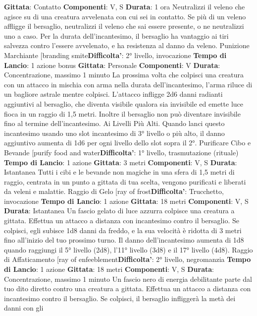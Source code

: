 \begin{multicols}{2}
\textbf{Gittata}: Contatto
\textbf{Componenti}: V, S
\textbf{Durata}: 1 ora
Neutralizzi il veleno che agisce su di una creatura
avvelenata con cui sei in contatto. Se più di un veleno
affligge il bersaglio, neutralizzi il veleno che sai essere
presente, o ne neutralizzi uno a caso.
Per la durata dell’incantesimo, il bersaglio ha vantaggio
ai tiri salvezza contro l’essere avvelenato, e ha
resistenza al danno da veleno.
Punizione Marchiante
[branding smite\textbf{Difficolta'}:
2° livello, invocazione
\textbf{Tempo di Lancio}: 1 azione bonus
\textbf{Gittata}: Personale
\textbf{Componenti}: V
\textbf{Durata}: Concentrazione, massimo 1 minuto
La prossima volta che colpisci una creatura con un
attacco in mischia con arma nella durata
dell’incantesimo, l’arma riluce di un bagliore astrale
mentre colpisci. L’attacco infligge 2d6 danni radianti
aggiuntivi al bersaglio, che diventa visibile qualora sia
invisibile ed emette luce fioca in un raggio di 1,5 metri.
Inoltre il bersaglio non può diventare invisibile fino al
termine dell’incantesimo.
Ai Livelli Più Alti. Quando lanci questo incantesimo
usando uno slot incantesimo di 3° livello o più alto, il
danno aggiuntivo aumenta di 1d6 per ogni livello dello
slot sopra il 2°.
Purificare Cibo e Bevande
[purify food and water\textbf{Difficolta'}:
1° livello, trasmutazione (rituale)
\textbf{Tempo di Lancio}: 1 azione
\textbf{Gittata}: 3 metri
\textbf{Componenti}: V, S
\textbf{Durata}: Istantanea
Tutti i cibi e le bevande non magiche in una sfera di 1,5
metri di raggio, centrata in un punto a gittata di tua
scelta, vengono purificati e liberati da veleni e malattie.
Raggio di Gelo
[ray of frost\textbf{Difficolta'}:
Trucchetto, invocazione
\textbf{Tempo di Lancio}: 1 azione
\textbf{Gittata}: 18 metri
\textbf{Componenti}: V, S
\textbf{Durata}: Istantanea
Un fascio gelato di luce azzurra colpisce una creatura a
gittata. Effettua un attacco a distanza con incantesimo
contro il bersaglio. Se colpisci, egli subisce 1d8 danni
da freddo, e la sua velocità è ridotta di 3 metri fino
all’inizio del tuo prossimo turno.
Il danno dell’incantesimo aumenta di 1d8 quando
raggiungi il 5° livello (2d8), l’11° livello (3d8) e il 17°
livello (4d8).
Raggio di Affaticamento
[ray of enfeeblement\textbf{Difficolta'}:
2° livello, negromanzia
\textbf{Tempo di Lancio}: 1 azione
\textbf{Gittata}: 18 metri
\textbf{Componenti}: V, S
\textbf{Durata}: Concentrazione, massimo 1 minuto
Un fascio nero di energia debilitante parte dal tuo dito
diretto contro una creatura a gittata. Effettua un attacco
a distanza con incantesimo contro il bersaglio. Se
colpisci, il bersaglio infliggerà la metà dei danni con gli

\end{multicols}
